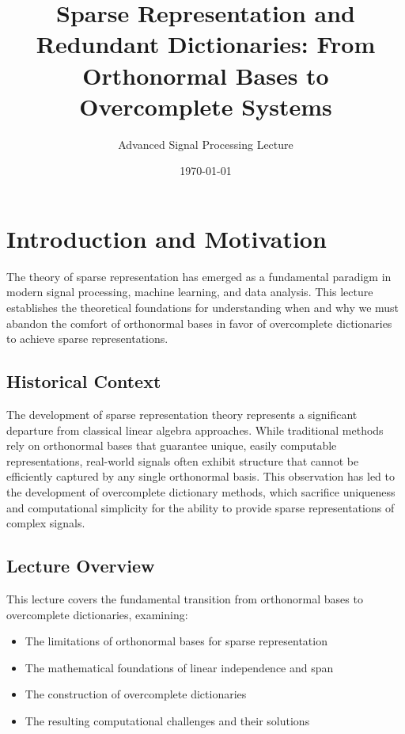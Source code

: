 \documentclass[12pt]{article}
\title{Sparse Representation and Redundant Dictionaries: From Orthonormal Bases to Overcomplete Systems}
\author{Advanced Signal Processing Lecture}
\date{\today}
\theoremstyle{definition}
\begin{document}
\maketitle

\tableofcontents
\newpage


\section{Introduction and Motivation}

The theory of sparse representation has emerged as a fundamental paradigm in modern signal processing, machine learning, and data analysis. This lecture establishes the theoretical foundations for understanding when and why we must abandon the comfort of orthonormal bases in favor of overcomplete dictionaries to achieve sparse representations.

\subsection{Historical Context}

The development of sparse representation theory represents a significant departure from classical linear algebra approaches. While traditional methods rely on orthonormal bases that guarantee unique, easily computable representations, real-world signals often exhibit structure that cannot be efficiently captured by any single orthonormal basis. This observation has led to the development of overcomplete dictionary methods, which sacrifice uniqueness and computational simplicity for the ability to provide sparse representations of complex signals.

\subsection{Lecture Overview}

This lecture covers the fundamental transition from orthonormal bases to overcomplete dictionaries, examining:
\begin{itemize}
    \item The limitations of orthonormal bases for sparse representation
    \item The mathematical foundations of linear independence and span
    \item The construction of overcomplete dictionaries
    \item The resulting computational challenges and their solutions
\end{itemize}
\end{document}
